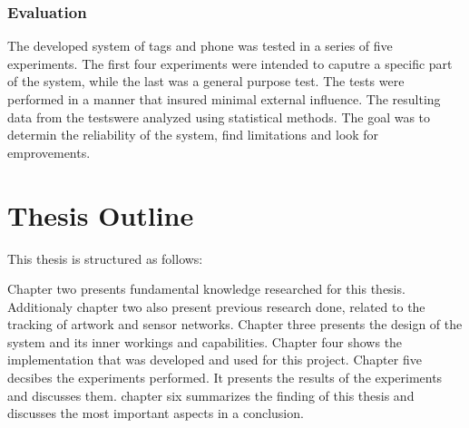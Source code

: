 \subsubsection{Evaluation}
The developed system of tags and phone was tested in a series of five experiments.
The first four experiments were intended to caputre a specific part of the system, while the last was a general purpose test.
The tests were performed in a manner that insured minimal external influence.
The resulting data from the testswere analyzed using statistical methods.
The goal was to determin the reliability of the system, find limitations and look for emprovements.

\section{Thesis Outline}

This thesis is structured as follows:

Chapter two presents fundamental knowledge researched for this thesis. 
Additionaly chapter two also present previous research done, related to the tracking of artwork and sensor networks.
Chapter three presents the design of the system and its inner workings and capabilities.
Chapter four shows the implementation that was developed and used for this project.
Chapter five decsibes the experiments performed. It presents the results of the experiments and discusses them.
chapter six summarizes the finding of this thesis and discusses the most important aspects in a conclusion.


%
%
%
%
%
%
